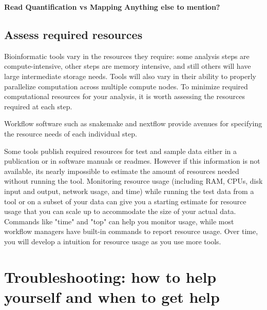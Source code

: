 \documentclass[10pt,letterpaper]{article}
\begin{document}
\textbf{Read Quantification vs Mapping}
\textbf{Anything else to mention?}


\subsection*{Assess required resources}

Bioinformatic tools vary in the resources they require: some analysis steps are compute-intensive, other steps are memory intensive, and still others will have large intermediate storage needs. 
Tools will also vary in their ability to properly parallelize computation across multiple compute nodes. 
To minimize required computational resources for your analysis, it is worth assessing the resources required at each step.

Workflow software such as snakemake and nextflow provide avenues for specifying the resource needs of each individual step.

Some tools publish required resources for test and sample data either in a publication or in software manuals or readmes. 
However if this information is not available, its nearly impossible to estimate the amount of resources needed without running the tool. 
Monitoring resource usage (including RAM, CPUs, disk input and output, network usage, and time) while running the test data from a tool or on a subset of your data can give you a starting estimate for resource usage that you can scale up to accommodate the size of your actual data. 
Commands like "time" and "top" can help you monitor usage, while most workflow managers have built-in commands to report resource usage. 
Over time, you will develop a intuition for resource usage as you use more tools.


\section*{Troubleshooting: how to help yourself and when to get help}
\end{document}
